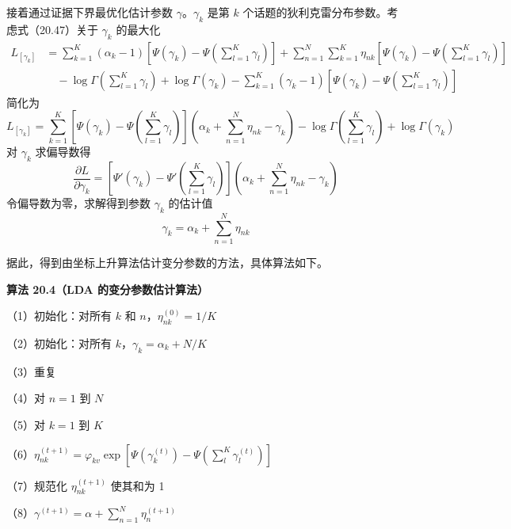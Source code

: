 \documentclass[UTF8, 12pt, fontset=fandol, oneside]{ctexart}
\begin{document}
接着通过证据下界最优化估计参数 $\gamma$。$\gamma_k$ 是第 $k$ 个话题的狄利克雷分布参数。考虑式（20.47）关于 $\gamma_k$ 的最大化
\begin{equation}
\begin{aligned}
L_{[\gamma_k]}
&=\sum_{k=1}^K(\alpha_k-1)\left[\Psi(\gamma_k)-\Psi\left(\sum_{l=1}^K\gamma_l\right)\right]
+\sum_{n=1}^N\sum_{k=1}^K \eta_{nk}\left[\Psi(\gamma_k)-\Psi\left(\sum_{l=1}^K\gamma_l\right)\right]\\
&\quad -\log\Gamma\left(\sum_{l=1}^K\gamma_l\right)+\log\Gamma(\gamma_k)
-\sum_{k=1}^K(\gamma_k-1)\left[\Psi(\gamma_k)-\Psi\left(\sum_{l=1}^K\gamma_l\right)\right]
\end{aligned}
\tag{20.59}
\end{equation}
简化为
\begin{equation}
L_{[\gamma_k]}=\sum_{k=1}^K\left[\Psi(\gamma_k)-\Psi\left(\sum_{l=1}^K\gamma_l\right)\right]\left(\alpha_k+\sum_{n=1}^N\eta_{nk}-\gamma_k\right)-\log\Gamma\left(\sum_{l=1}^K\gamma_l\right)+\log\Gamma(\gamma_k)
\tag{20.60}
\end{equation}
对 $\gamma_k$ 求偏导数得
\begin{equation}
\frac{\partial L}{\partial \gamma_k}=\left[\Psi'(\gamma_k)-\Psi'\left(\sum_{l=1}^K\gamma_l\right)\right]\left(\alpha_k+\sum_{n=1}^N\eta_{nk}-\gamma_k\right)
\tag{20.61}
\end{equation}
令偏导数为零，求解得到参数 $\gamma_k$ 的估计值
\begin{equation}
\gamma_k=\alpha_k+\sum_{n=1}^N\eta_{nk}
\tag{20.62}
\end{equation}

据此，得到由坐标上升算法估计变分参数的方法，具体算法如下。

\noindent\textbf{算法 20.4（LDA 的变分参数估计算法）}

（1）初始化：对所有 $k$ 和 $n$，$\eta_{nk}^{(0)}=1/K$

（2）初始化：对所有 $k$，$\gamma_k=\alpha_k+N/K$

（3）重复

（4）\quad 对 $n=1$ 到 $N$

（5）\quad\quad 对 $k=1$ 到 $K$

（6）\quad\quad $\eta_{nk}^{(t+1)}=\varphi_{kv}\exp\left[\Psi(\gamma_k^{(t)})-\Psi\left(\sum_l^K\gamma_l^{(t)}\right)\right]$

（7）\quad\quad 规范化 $\eta_{nk}^{(t+1)}$ 使其和为 1

（8）\quad $\gamma^{(t+1)}=\alpha+\sum_{n=1}^N \eta_n^{(t+1)}$
\end{document}
